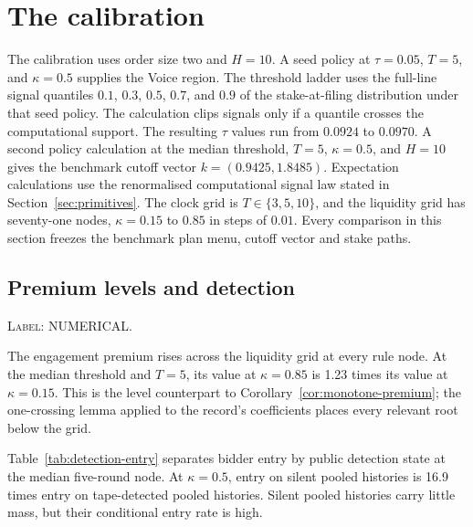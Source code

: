 \documentclass[11pt]{article}
\begin{document}
\section{The calibration}
\label{sec:calibration}

The calibration uses order size two and $H=10$. A seed policy at $\tau=0.05$, $T=5$, and
$\kappa=0.5$ supplies the Voice region. The threshold ladder uses the full-line signal quantiles
$0.1$, $0.3$, $0.5$, $0.7$, and $0.9$ of the stake-at-filing distribution under that seed policy.
The calculation clips signals only if a quantile crosses the computational support. The resulting
$\tau$ values run from $0.0924$ to $0.0970$. A second policy calculation at the median threshold,
$T=5$, $\kappa=0.5$, and $H=10$ gives the benchmark cutoff vector $k=(0.9425,1.8485)$. Expectation
calculations use the renormalised computational signal law stated in Section~\ref{sec:primitives}.
The clock grid is $T\in\{3,5,10\}$, and the liquidity grid has seventy-one nodes,
$\kappa=0.15$ to $0.85$ in steps of $0.01$. Every comparison in this section freezes the benchmark
plan menu, cutoff vector and stake paths.

\subsection{Premium levels and detection}

\noindent\textsc{Label: NUMERICAL.}\par
The engagement premium rises across the liquidity grid at every rule node. At the median threshold
and $T=5$, its value at $\kappa=0.85$ is 1.23 times its value at $\kappa=0.15$. This is the level
counterpart to Corollary~\ref{cor:monotone-premium}; the one-crossing lemma applied to the record's
coefficients places every relevant root below the grid.

Table~\ref{tab:detection-entry} separates bidder entry by public detection state at the median
five-round node. At $\kappa=0.5$, entry on silent pooled histories is 16.9 times entry on
tape-detected pooled histories. Silent pooled histories carry little mass, but their conditional
entry rate is high.
\end{document}
